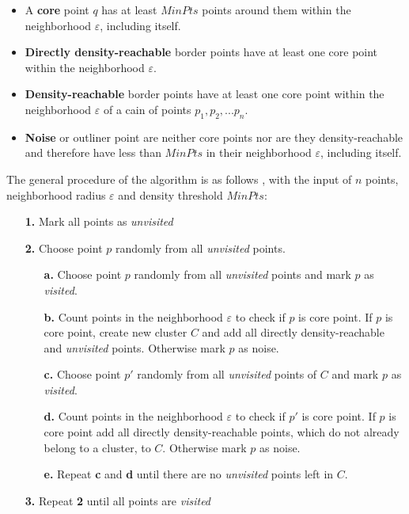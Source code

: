 \begin{itemize}
	\item A \textbf{core} point $q$ has at least $MinPts$ points around them within the neighborhood $\varepsilon$, including itself.
    \item \textbf{Directly density-reachable} border points have at least one core point within the neighborhood $\varepsilon$.
     \item \textbf{Density-reachable} border points have at least one core point within the neighborhood $\varepsilon$ of a cain of points $p_1,p_2,...p_n$.
 	\item \textbf{Noise} or outliner point are neither core points nor are they density-reachable and therefore have less than $MinPts$ in their neighborhood $\varepsilon$, including itself.
\end{itemize}

The general procedure of the algorithm is as follows \parencite{Zhao2018}, with the input of $n$ points, neighborhood radius $\varepsilon$ and density threshold $MinPts$:

\begin{itemize}
	\item[\textbf{1.}] Mark all points as \textit{unvisited}
	\item[\textbf{2.}] Choose point $p$ randomly from all \textit{unvisited} points.
	\begin{itemize}
		\item[\textbf{a.}] Choose point $p$ randomly from all \textit{unvisited} points and mark $p$ as \textit{visited}.
		\item[\textbf{b.}] Count points in the neighborhood $\varepsilon$ to check if $p$ is core point. If $p$ is core point, create new cluster $C$ and add all directly density-reachable and \textit{unvisited} points. Otherwise mark $p$ as noise.
		\item[\textbf{c.}] Choose point $p'$ randomly from all \textit{unvisited} points of $C$ and mark $p$ as \textit{visited}.
		\item[\textbf{d.}] Count points in the neighborhood $\varepsilon$ to check if $p'$ is core point. If $p$ is core point add all directly density-reachable points, which do not already belong to a cluster, to $C$. Otherwise mark $p$ as noise.
		\item[\textbf{e.}] Repeat \textbf{c} and \textbf{d} until there are no \textit{unvisited} points left in $C$.	
	\end{itemize} 
	\item[\textbf{3.}] Repeat \textbf{2} until all points are \textit{visited} 
\end{itemize}

